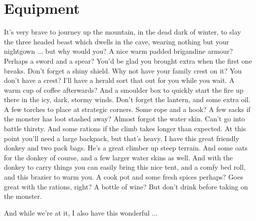 

\cleardoublepage

\chapter*{Equipment}

\begin{readoutloud}
It's very brave to journey up the mountain, in the dead dark of winter, to slay the three headed beast which dwells in the cave, wearing nothing but your nightgown ... but why would you? A nice warm padded brigandine armour? Perhaps a sword and a spear? You'd be glad you brought extra when the first one breaks. Don't forget a shiny shield. Why not have your family crest on it? You don't have a crest? I'll have a herald sort that out for you while you wait. A warm cup of coffee afterwards? And a smoulder box to quickly start the fire up there in the icy, dark, stormy winds. Don't forget the lantern, and some extra oil. A few torches to place at strategic corners. Some rope and a hook? A few sacks if the monster has loot stashed away? Almost forgot the water skin. Can't go into battle thirsty. And some rations if the climb takes longer than expected. At this point you'll need a large backpack, but that's heavy. I have this great friendly donkey and two pack bags. He's a great climber up steep terrain. And some oats for the donkey of course, and a few larger water skins as well. And with the donkey to carry things you can easily bring this nice tent, and a comfy bed roll, and this brazier to warm you. A cook pot and some fresh spices perhaps? Goes great with the rations, right? A bottle of wine? But don't drink before taking on the monster.

And while we're at it, I also have this wonderful ...
\end{readoutloud}









%
%
%
%
%



